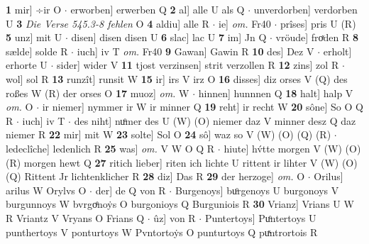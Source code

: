 \documentclass[8pt,a4paper,notitlepage]{article}
\begin{document}
\begin{table}[ht]
\begin{minipage}[t]{0.5\linewidth}
\textbf{1} mir] ÷ir O  $\cdot$ erworben] erwerben Q \textbf{2} al] alle U als Q  $\cdot$ unverdorben] verdorben U \textbf{3} \textit{Die Verse 545.3-8 fehlen} O  \textbf{4} aldiu] alle R  $\cdot$ ie] \textit{om.} Fr40  $\cdot$ prîses] pris U (R) \textbf{5} unz] mit U  $\cdot$ disen] disen disen U \textbf{6} slac] lac U \textbf{7} im] Jn Q  $\cdot$ vröude] froͯden R \textbf{8} sælde] solde R  $\cdot$ iuch] iv T \textit{om.} Fr40 \textbf{9} Gawan] Gawin R \textbf{10} des] Dez V  $\cdot$ erholt] erhorte U  $\cdot$ sider] wider V \textbf{11} tjost verzinsen] strit verzollen R \textbf{12} zins] zol R  $\cdot$ wol] sol R \textbf{13} runzît] runsit W \textbf{15} ir] irs V irz O \textbf{16} disses] diz orses V (Q) des roßes W (R) der orses O \textbf{17} muoz] \textit{om.} W  $\cdot$ hinnen] hunnnen Q \textbf{18} halt] halp V \textit{om.} O  $\cdot$ ir niemer] nymmer ir W ir minner Q \textbf{19} reht] ir recht W \textbf{20} sône] So O Q R  $\cdot$ iuch] iv T  $\cdot$ des niht] nuͦmer des U (W) (O) niemer daz V minner desz Q daz niemer R \textbf{22} mir] mit W \textbf{23} solte] Sol O \textbf{24} sô] waz so V (W) (O) (Q) (R)  $\cdot$ ledeclîche] ledenlich R \textbf{25} was] \textit{om.} V W O Q R  $\cdot$ hiute] hv́tte morgen V (W) (O) (R) morgen hewt Q \textbf{27} ritich lieber] riten ich lichte U rittent ir lihter V (W) (O) (Q) Rittent Jr lichtenklicher R \textbf{28} diz] Das R \textbf{29} der herzoge] \textit{om.} O  $\cdot$ Orilus] arilus W Orylvs O  $\cdot$ der] de Q von R  $\cdot$ Burgenoys] buͦrgenoys U burgonoys V burgunnoys W bvrgoͤnoẏs O burgonioys Q Burguniois R \textbf{30} Vrianz] Vrians U W R Vriantz V Vryans O Frians Q  $\cdot$ ûz] von R  $\cdot$ Puntertoys] Puͦntertoys U punthertoys V ponturtoys W Pvntortoẏs O punturtoys Q puͯntrortois R \newline
\end{minipage}
\end{table}
\end{document}
